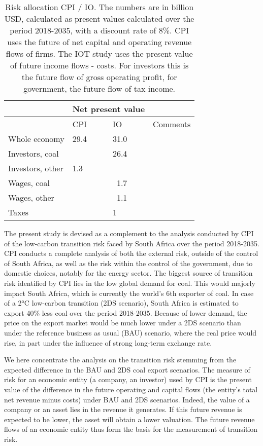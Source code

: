 \documentclass[12pt,english]{article}
\begin{document}
\begin{table}[!t]
	\centering
	\begin{tabular}{lp{80pt}p{80pt} p{200pt}}
		\toprule
	 &\multicolumn{2}{c}{Net present value} \\	
	 \midrule													
	& CPI & IO & Comments\\	

	 \midrule													
Whole economy	& 29.4  & 31.0 & \\	
Investors, coal	&   & 26.4  &  \\	
Investors, other	&  1.3 &  & \\	
Wages, coal	&  & \ 1.7  &  \\	
Wages, other	&   & \ 1.1 & \\	
Taxes	&   & 1 & \\	
		\bottomrule
	\end{tabular}
	\caption{\label{External risk}Risk allocation CPI / IO. The numbers are in billion USD, calculated as present values calculated over the period 2018-2035, with a discount rate of 8\%. CPI uses the future of net capital and operating revenue flows of firms. The IOT study uses the present value of future income flows - costs. For investors this is the future flow of gross operating profit, for government, the future flow of tax income.}
\end{table}

The present study is devised as a complement to the analysis conducted by CPI of the low-carbon transition risk faced by South Africa over the period 2018-2035. CPI conducts a complete analysis of both the external risk, outside of the control of South Africa, as well as the risk within the control of the government, due to domestic choices, notably for the energy sector. The biggest source of transition risk identified by CPI lies in the low global demand for coal. This would majorly impact South Africa, which is currently the world's 6th exporter of coal. In case of a 2°C low-carbon transition (2DS scenario), South Africa is estimated to export 40\% less coal over the period 2018-2035. Because of lower demand, the price on the export market would be much lower under a 2DS scenario than under the reference business as usual (BAU) scenario, where the real price would rise, in part under the influence of strong long-term exchange rate. 

We here concentrate the analysis on the transition risk stemming from the expected difference in the BAU and 2DS coal export scenarios. The measure of risk for an economic entity (a company, an investor) used by CPI is the present value of the difference in the future operating and capital flows (the entity's total net revenue minus costs) under BAU and 2DS scenarios. Indeed, the value of a company or an asset lies in the revenue it generates. If this future revenue is expected to be lower, the asset will obtain a lower valuation. The future revenue flows of an economic entity thus form the basis for the measurement of transition risk.
\end{document}
